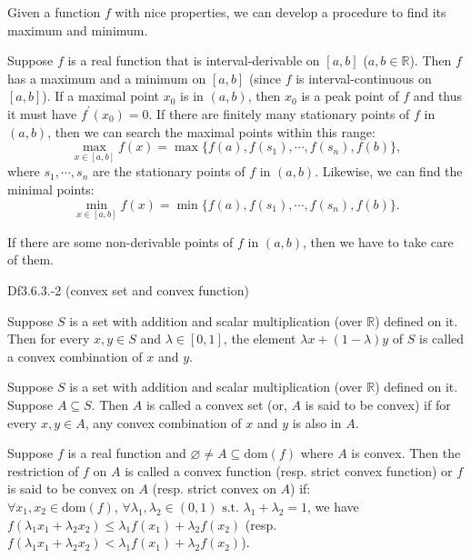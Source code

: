 \documentclass{article}
\begin{document}
\begin{Rmk}{}
    Given a function $f$ with nice properties, we can develop a procedure to find its maximum and minimum.

    Suppose $f$ is a real function that is interval-derivable on $[a,b]$ ($a,b\in\mathbb{R}$). Then $f$ has a maximum and a minimum on $[a,b]$ (since $f$ is interval-continuous on $[a,b]$). If a maximal point $x_0$ is in $(a,b)$, then $x_0$ is a peak point of $f$ and thus it must have $f^\prime(x_0) = 0$. If there are finitely many stationary points of $f$ in $(a,b)$, then we can search the maximal points within this range:
    $$ \max_{x\in [a,b]} f(x) = \max\{f(a), f(s_1), \cdots, f(s_n), f(b)\}, $$
    where $s_1, \cdots, s_n$ are the stationary points of $f$ in $(a,b)$. Likewise, we can find the minimal points:
    $$ \min_{x\in [a,b]} f(x) = \min\{f(a), f(s_1), \cdots, f(s_n), f(b)\}. $$

    If there are some non-derivable points of $f$ in $(a,b)$, then we have to take care of them. 
\end{Rmk}

\begin{Df}{Df3.6.3.-2 (convex set and convex function)}
    \begin{compactenum}
        \item Suppose $S$ is a set with addition and scalar multiplication (over $\mathbb{R}$) defined on it. Then for every $x, y\in S$ and $\lambda\in [0,1]$, the element $\lambda x + (1-\lambda)y$ of $S$ is called a convex combination of $x$ and $y$. 
        \item Suppose $S$ is a set with addition and scalar multiplication (over $\mathbb{R}$) defined on it. Suppose $A\subseteq S$. Then $A$ is called a convex set (or, $A$ is said to be convex) if for every $x, y\in A$, any convex combination of $x$ and $y$ is also in $A$.
        \item Suppose $f$ is a real function and $\varnothing\neq A\subseteq\text{dom}(f)$ where $A$ is convex. Then the restriction of $f$ on $A$ is called a convex function (resp. strict convex function) or $f$ is said to be convex on $A$ (resp. strict convex on $A$) if: \\
        $\forall x_1, x_2\in \text{dom}(f)$, $\forall \lambda_1, \lambda_2\in (0,1) \text{ s.t. } \lambda_1+\lambda_2=1$, we have $f(\lambda_1 x_1 + \lambda_2 x_2) \leq \lambda_1 f(x_1) + \lambda_2 f(x_2)$ (resp. $f(\lambda_1 x_1 + \lambda_2 x_2) < \lambda_1 f(x_1) + \lambda_2 f(x_2)$).
    \end{compactenum}
\end{Df}
\end{document}
